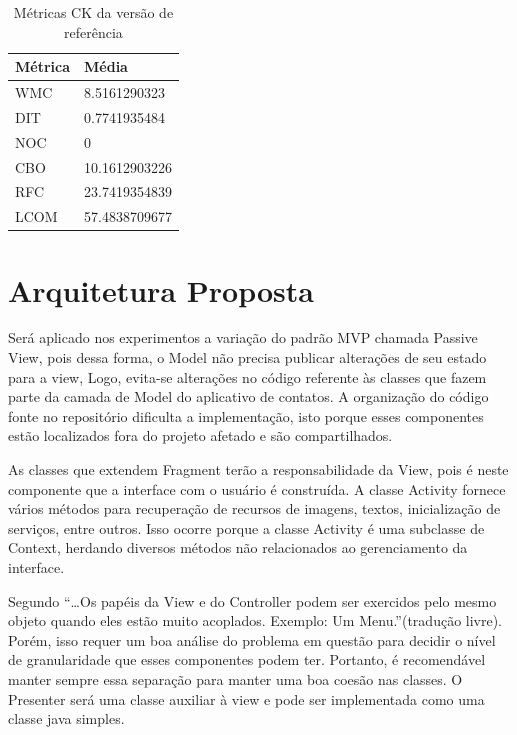 \begin{table}[!h]
	\centering
	    \caption{Métricas CK da versão de referência}
	
    \begin{tabular}{ | l | l | }
    \hline
    Métrica &	Média \\ \hline
    WMC  	&	8.5161290323   	\\ \hline
    DIT	 	&	0.7741935484	\\ \hline
	NOC  	& 	0				\\ \hline
	CBO	  	& 	10.1612903226	\\ \hline
	RFC	 	& 	23.7419354839	\\ \hline
	LCOM 	& 	57.4838709677	\\ \hline
    \end{tabular}
    \label{tab:dados_baseline}
\end{table}


\section{Arquitetura Proposta}

Será aplicado nos experimentos a variação do padrão MVP chamada Passive View,
pois dessa forma, o Model não precisa publicar alterações de seu estado para a
view, Logo, evita-se alterações no código referente às classes que fazem
parte da camada de Model do aplicativo de contatos. A organização do código
fonte no repositório dificulta a implementação, isto porque esses componentes estão
localizados fora do projeto afetado e são compartilhados.

As classes que extendem Fragment terão a responsabilidade da View, pois é neste
componente que a interface com o usuário é construída. A classe Activity fornece
vários métodos para recuperação de recursos de imagens, textos, inicialização de
serviços, entre outros. Isso ocorre porque a classe Activity é uma subclasse de Context, herdando diversos métodos não relacionados ao gerenciamento da interface.

Segundo  ``\ldots Os papéis da View e do
Controller podem ser exercidos pelo mesmo objeto quando eles estão muito
acoplados. Exemplo: Um Menu.''(tradução livre). Porém, isso requer um boa
análise do problema em questão para decidir o nível de granularidade que esses componentes podem ter.
Portanto, é recomendável manter sempre essa separação para manter uma boa coesão
nas classes. O Presenter será uma classe auxiliar à view e pode ser implementada
como uma classe java simples. 



